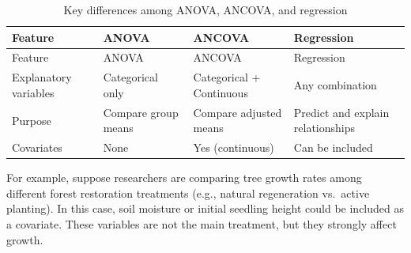 \documentclass[
]{book}
\begin{document}
\begin{longtable}[]{@{}
  >{\raggedright\arraybackslash}p{}
  >{\raggedright\arraybackslash}p{}
  >{\raggedright\arraybackslash}p{}
  >{\raggedright\arraybackslash}p{}@{}}
\caption{\label{tab:differences} Key differences among ANOVA, ANCOVA, and regression}\tabularnewline
\toprule\noalign{}
\begin{minipage}[b]{\linewidth}\raggedright
Feature
\end{minipage} & \begin{minipage}[b]{\linewidth}\raggedright
ANOVA
\end{minipage} & \begin{minipage}[b]{\linewidth}\raggedright
ANCOVA
\end{minipage} & \begin{minipage}[b]{\linewidth}\raggedright
Regression
\end{minipage} \\
\midrule\noalign{}
\endfirsthead
\toprule\noalign{}
\begin{minipage}[b]{\linewidth}\raggedright
Feature
\end{minipage} & \begin{minipage}[b]{\linewidth}\raggedright
ANOVA
\end{minipage} & \begin{minipage}[b]{\linewidth}\raggedright
ANCOVA
\end{minipage} & \begin{minipage}[b]{\linewidth}\raggedright
Regression
\end{minipage} \\
\midrule\noalign{}
\endhead
\bottomrule\noalign{}
\endlastfoot
Explanatory variables & Categorical only & Categorical + Continuous & Any combination \\
Purpose & Compare group means & Compare adjusted means & Predict and explain relationships \\
Covariates & None & Yes (continuous) & Can be included \\
\end{longtable}

For example, suppose researchers are comparing tree growth rates among different forest restoration treatments (e.g., natural regeneration vs.~active planting). In this case, soil moisture or initial seedling height could be included as a covariate. These variables are not the main treatment, but they strongly affect growth.
\end{document}
